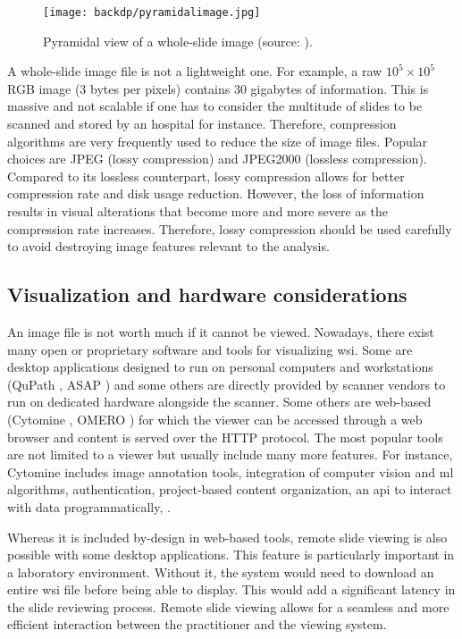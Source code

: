 \begin{figure}
  \centering
  \texttt{[image: backdp/pyramidalimage.jpg]}
  \caption{Pyramidal view of a whole-slide image (source: \cite{marini2022multi_scale_tools}).}
  \label{fig:backdp:pyramidalimage}
\end{figure}

A whole-slide image file is not a lightweight one. For example, a raw $10^5 \times 10^5$ RGB image (3 bytes per pixels) contains 30 gigabytes of information. This is massive and not scalable if one has to consider the multitude of slides to be scanned and stored by an hospital for instance. Therefore, compression algorithms are very frequently used to reduce the size of image files. Popular choices are JPEG (lossy compression) and JPEG2000 (lossless compression). Compared to its lossless counterpart, lossy compression allows for better compression rate and disk usage reduction. However, the loss of information results in visual alterations that become more and more severe as the compression rate increases. Therefore, lossy compression should be used carefully to avoid destroying image features relevant to the analysis. 

\subsection{Visualization and hardware considerations}
\label{ssec:backdp:visualization}

An image file is not worth much if it cannot be viewed. Nowadays, there exist many open or proprietary software and tools for visualizing \acrshort{wsi}. Some are desktop applications designed to run on personal computers and workstations (\eg QuPath \cite{bankhead2017qupath}, ASAP \cite{cpg2022asap}) and some others are directly provided by scanner vendors to run on dedicated hardware alongside the scanner. Some others are web-based (\eg Cytomine \cite{maree2016collaborative}, OMERO \cite{allan2012omero}) for which the viewer can be accessed through a web browser and content is served over the HTTP protocol. The most popular tools are not limited to a viewer but usually include many more features. For instance, Cytomine includes image annotation tools, integration of computer vision and \acrlong{ml} algorithms, authentication, project-based content organization, an \acrshort{api} to interact with data programmatically, \etc.

Whereas it is included by-design in web-based tools, remote slide viewing is also possible with some desktop applications. This feature is particularly important in a laboratory environment. Without it, the system would need to download an entire \acrshort{wsi} file before being able to display. This would add a significant latency in the slide reviewing process. Remote slide viewing allows for a seamless and more efficient interaction between the practitioner and the viewing system.

